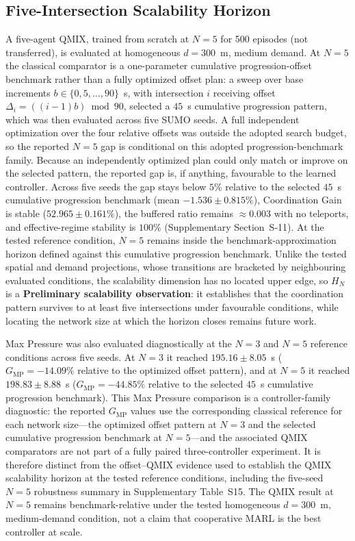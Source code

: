\documentclass[review,12pt]{elsarticle}
\begin{document}
\subsection{Five-Intersection Scalability Horizon}
\label{subsec:n5_scalability}

A five-agent QMIX, trained from scratch at $N=5$ for 500 episodes (not transferred), is evaluated at homogeneous $d=300$~m, medium demand. At $N=5$ the classical comparator is a one-parameter cumulative progression-offset benchmark rather than a fully optimized offset plan: a sweep over base increments $b\in\{0,5,\ldots,90\}$~s, with intersection $i$ receiving offset $\Delta_i=((i-1)b)\bmod90$, selected a $45$~s cumulative progression pattern, which was then evaluated across five SUMO seeds. A full independent optimization over the four relative offsets was outside the adopted search budget, so the reported $N=5$ gap is conditional on this adopted progression-benchmark family. Because an independently optimized plan could only match or improve on the selected pattern, the reported gap is, if anything, favourable to the learned controller. Across five seeds the gap stays below $5\%$ relative to the selected $45$~s cumulative progression benchmark (mean $-1.536\pm0.815\%$), Coordination Gain is stable ($52.965\pm0.161\%$), the buffered ratio remains $\approx0.003$ with no teleports, and effective-regime stability is $100\%$ (Supplementary Section~S-11). At the tested reference condition, $N=5$ remains inside the benchmark-approximation horizon defined against this cumulative progression benchmark. Unlike the tested spatial and demand projections, whose transitions are bracketed by neighbouring evaluated conditions, the scalability dimension has no located upper edge, so $H_N$ is a \textbf{Preliminary scalability observation}: it establishes that the coordination pattern survives to at least five intersections under favourable conditions, while locating the network size at which the horizon closes remains future work.

Max Pressure was also evaluated diagnostically at the $N=3$ and $N=5$ reference conditions across five seeds. At $N=3$ it reached $195.16\pm8.05$~s ($G_{\mathrm{MP}}=-14.09\%$ relative to the optimized offset pattern), and at $N=5$ it reached $198.83\pm8.88$~s ($G_{\mathrm{MP}}=-44.85\%$ relative to the selected $45$~s cumulative progression benchmark). This Max Pressure comparison is a controller-family diagnostic: the reported $G_{\mathrm{MP}}$ values use the corresponding classical reference for each network size---the optimized offset pattern at $N=3$ and the selected cumulative progression benchmark at $N=5$---and the associated QMIX comparators are not part of a fully paired three-controller experiment. It is therefore distinct from the offset--QMIX evidence used to establish the QMIX scalability horizon at the tested reference conditions, including the five-seed $N=5$ robustness summary in Supplementary Table~S15. The QMIX result at $N=5$ remains benchmark-relative under the tested homogeneous $d=300$~m, medium-demand condition, not a claim that cooperative MARL is the best controller at scale.
\end{document}

